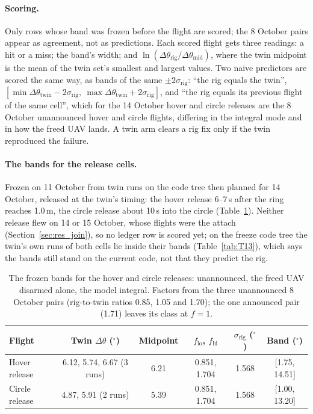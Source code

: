 \paragraph{Scoring.} Only rows whose band was frozen before the flight are scored; the 8 October pairs appear
as agreement, not as predictions. Each scored flight gets three readings: a hit or a miss; the band's width;
and $\ln(\Delta\theta_{\mathrm{rig}}/\Delta\theta_{\mathrm{mid}})$, where the twin midpoint is the mean of the
twin set's smallest and largest values. Two naive predictors are scored the same way, as bands of the same
$\pm2\sigma_{\mathrm{rig}}$: ``the rig equals the twin'',
$[\min\Delta\theta_{\mathrm{twin}}-2\sigma_{\mathrm{rig}},\ \max\Delta\theta_{\mathrm{twin}}+2\sigma_{\mathrm{rig}}]$,
and ``the rig equals its previous flight of the same cell'', which for the 14 October hover and circle releases
are the 8 October unannounced hover and circle flights, differing in the integral mode and in how the freed
UAV lands. A twin arm clears a rig fix only if the twin reproduced the failure.

\paragraph{The bands for the release cells.} Frozen on 11 October from twin runs on the code tree then planned for
14 October, released at the twin's timing: the hover release 6--7\,s after the ring reaches 1.0\,m, the circle release about 10\,s
into the circle (Table~\ref{tab:ledger_bands}). Neither release flew on 14 or 15 October, whose flights were the attach
(Section~\ref{sec:res_join}), so no ledger row is scored yet; on the freeze code tree the twin's own runs of both cells
lie inside their bands (Table~\ref{tab:T13}), which says the bands still stand on the current code, not that they
predict the rig.

\begin{table}[h]
\centering
\small
\caption{The frozen bands for the hover and circle releases: unannounced, the freed UAV disarmed alone, the model
integral. Factors from the three unannounced 8 October pairs (rig-to-twin ratios 0.85, 1.05 and 1.70); the one
announced pair (1.71) leaves its class at $f=1$.}
\label{tab:ledger_bands}
\begin{tabularx}{\textwidth}{>{\raggedright\arraybackslash}Xccccc}
\toprule
Flight & Twin $\Delta\theta$ ($^\circ$) & Midpoint & $f_{\mathrm{lo}}$, $f_{\mathrm{hi}}$ & $\sigma_{\mathrm{rig}}$ ($^\circ$) & Band ($^\circ$) \\
\midrule
Hover release & 6.12, 5.74, 6.67 (3 runs) & 6.21 & 0.851, 1.704 & 1.568 & [1.75, 14.51] \\
Circle release & 4.87, 5.91 (2 runs) & 5.39 & 0.851, 1.704 & 1.568 & [1.00, 13.20] \\
\bottomrule
\end{tabularx}
\end{table}


